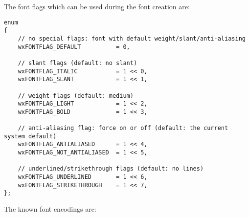 The font flags which can be used during the font creation are:

\begin{verbatim}
enum
{
    // no special flags: font with default weight/slant/anti-aliasing
    wxFONTFLAG_DEFAULT          = 0,

    // slant flags (default: no slant)
    wxFONTFLAG_ITALIC           = 1 << 0,
    wxFONTFLAG_SLANT            = 1 << 1,

    // weight flags (default: medium)
    wxFONTFLAG_LIGHT            = 1 << 2,
    wxFONTFLAG_BOLD             = 1 << 3,

    // anti-aliasing flag: force on or off (default: the current system default)
    wxFONTFLAG_ANTIALIASED      = 1 << 4,
    wxFONTFLAG_NOT_ANTIALIASED  = 1 << 5,

    // underlined/strikethrough flags (default: no lines)
    wxFONTFLAG_UNDERLINED       = 1 << 6,
    wxFONTFLAG_STRIKETHROUGH    = 1 << 7,
};
\end{verbatim}

The known font encodings are:

